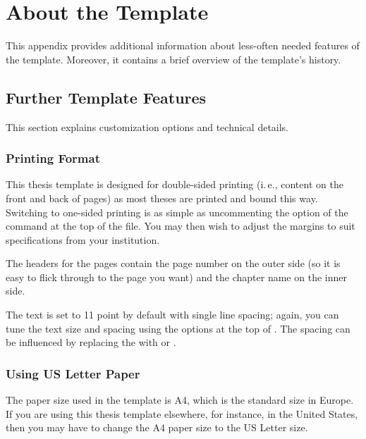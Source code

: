  
\chapter{About the Template}

This appendix provides additional information about less-often needed features of the template. Moreover, it contains a brief overview of the template's history. 

\section{Further Template Features}\label{ThesisFeatures}

This section explains customization options and technical details.

\subsection{Printing Format}

This%
thesis template is designed for double-sided printing (i.\,e., content on the front and back of pages) as most theses are printed and bound this way. Switching to one-sided printing is as simple as uncommenting the  option of the  command at the top of the  file. You may then wish to adjust the margins to suit specifications from your institution.

The headers for the pages contain the page number on the outer side (so it is easy to flick through to the page you want) and the chapter name on the inner side.

The text is set to 11 point by default with single line spacing; again, you can tune the text size and spacing using the options at the top of . The spacing can be influenced by replacing the  with  or .

\subsection{Using US Letter Paper}

The%
paper size used in the template is A4, which is the standard size in Europe. If you are using this thesis template elsewhere, for instance, in the United States, then you may have to change the A4 paper size to the US Letter size.

